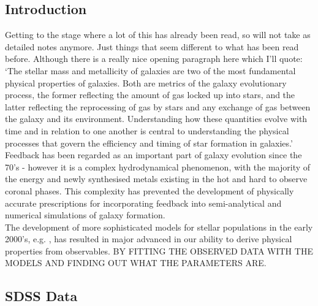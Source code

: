 \documentclass{literature}
\begin{document}
\subsection{Introduction}
Getting to the stage where a lot of this has already been read, so will not take as detailed notes anymore. Just things that seem different to what has been read before. Although there is a really nice opening paragraph here which I'll quote: 
`The stellar mass and metallicity of galaxies are two of the most fundamental physical properties of galaxies. Both are metrics of the galaxy evolutionary process, the former reflecting the amount of gas locked up into stars, and the latter reflecting the reprocessing of gas by stars and any exchange of gas between the galaxy and its environment. Understanding how these quantities evolve with time and in relation to one another is central to understanding the physical processes that govern the efficiency and timing of star formation in galaxies.' \\ 

Feedback has been regarded as an important part of galaxy evolution since the 70's - however it is a complex hydrodynamical phenomenon, with the majority of the energy and newly synthesised metals existing in the hot and hard to observe coronal phases. This complexity has prevented the development of physically accurate prescriptions for incorporating feedback into semi-analytical and numerical simulations of galaxy formation. \\

The development of more sophisticated models for stellar populations in the early 2000's, e.g. \citep{Bruzual2003}, has resulted in major advanced in our ability to derive physical properties from observables. BY FITTING THE OBSERVED DATA WITH THE MODELS AND FINDING OUT WHAT THE PARAMETERS ARE.
\subsection{SDSS Data}
\end{document}
